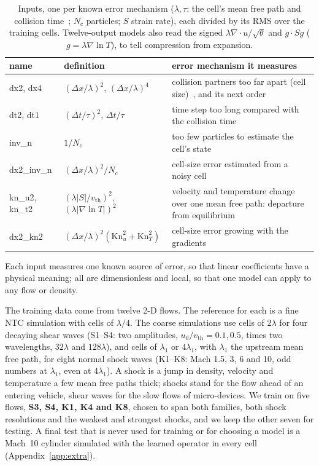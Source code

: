 \documentclass[10pt]{article}
\newcommand{\dx}{\Delta x}
\begin{document}
\begin{table}[H]
\centering\footnotesize
\caption{Inputs, one per known error mechanism ($\lambda,\tau$: the cell's mean free path and
collision time~\citep{koura1991}; $N_c$ particles; $S$ strain rate), each divided by its RMS over
the training cells. Twelve-output models also read the signed $\lambda\nabla\!\cdot u/\sqrt\theta$
and $g\cdot Sg$ ($g=\lambda\nabla\ln T$), to tell compression from expansion.}
\label{tab:features}
\begin{tabular}{@{}llp{}@{}}
\toprule
name & definition & error mechanism it measures \\ \midrule
dx2, dx4 & $(\dx/\lambda)^2$, $(\dx/\lambda)^4$ & collision partners too far apart (cell
size)~\citep{alexander1998,hadjiconstantinou2000}, and its next order \\
dt2, dt1 & $(\Delta t/\tau)^2$, $\Delta t/\tau$ & time step too long compared with the collision
time~\citep{garcia2000} \\
inv\_n & $1/N_c$ & too few particles to estimate the cell's state~\citep{hadjiconstantinou2003} \\
dx2\_inv\_n & $(\dx/\lambda)^2/N_c$ & cell-size error estimated from a noisy cell \\
kn\_u2, kn\_t2 & $(\lambda|S|/v_\mathrm{th})^2$, $(\lambda|\nabla\ln T|)^2$ & velocity and
temperature change over one mean free path: departure from equilibrium~\citep{chapman1970} \\
dx2\_kn2 & $(\dx/\lambda)^2(\mathrm{Kn}_u^2+\mathrm{Kn}_T^2)$ & cell-size error growing with the
gradients \\
\bottomrule
\end{tabular}
\end{table}

Each input measures one known source of error, so that linear coefficients have a physical
meaning; all are dimensionless and local, so that one model can apply to any flow or density.

The training data come from twelve 2-D flows. The reference for each is a fine NTC simulation
with cells of $\lambda/4$. The coarse simulations use cells of $2\lambda$ for four decaying shear
waves (S1--S4: two amplitudes, $u_0/v_\mathrm{th}=0.1, 0.5$, times two wavelengths, $32\lambda$
and $128\lambda$), and cells of $\lambda_1$ or $4\lambda_1$, with $\lambda_1$ the upstream mean
free path, for eight normal shock waves (K1--K8: Mach 1.5, 3, 6 and 10, odd numbers at
$\lambda_1$, even at $4\lambda_1$). A shock is a jump in density, velocity and temperature a
few mean free paths thick; shocks stand for the flow ahead of an entering vehicle, shear waves
for the slow flows of micro-devices. We train on five flows, \textbf{S3, S4, K1, K4 and K8}, chosen to span both
families, both shock resolutions and the weakest and strongest shocks, and we keep the other
seven for testing. A final test that is never used for training or for choosing a model is a
Mach~10 cylinder simulated with the learned operator in every cell (Appendix~\ref{app:extra}).
\end{document}
